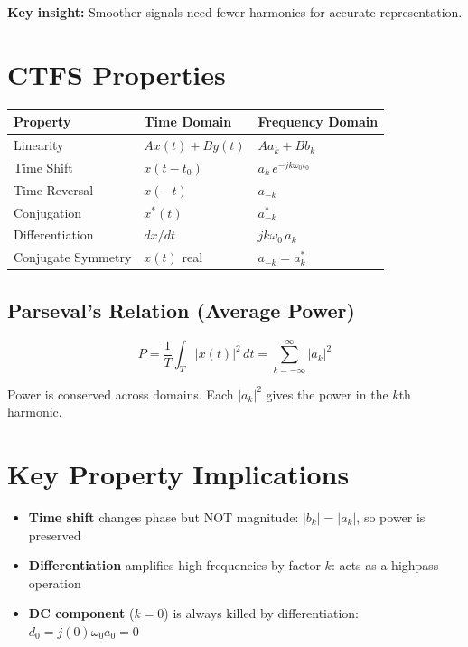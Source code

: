\documentclass[11pt]{article}
\begin{document}
\textbf{Key insight:} Smoother signals need fewer harmonics for accurate representation.

\section*{CTFS Properties}

\begin{center}
\begin{tabular}{|l|l|l|}
\hline
\textbf{Property} & \textbf{Time Domain} & \textbf{Frequency Domain} \\
\hline
Linearity & $Ax(t) + By(t)$ & $Aa_k + Bb_k$ \\
\hline
Time Shift & $x(t - t_0)$ & $a_k \, e^{-jk\omega_0 t_0}$ \\
\hline
Time Reversal & $x(-t)$ & $a_{-k}$ \\
\hline
Conjugation & $x^*(t)$ & $a_{-k}^*$ \\
\hline
Differentiation & $dx/dt$ & $jk\omega_0 \, a_k$ \\
\hline
Conjugate Symmetry & $x(t)$ real & $a_{-k} = a_k^*$ \\
\hline
\end{tabular}
\end{center}

\subsection*{Parseval's Relation (Average Power)}

\[P = \frac{1}{T} \int_T |x(t)|^2 \, dt = \sum_{k=-\infty}^{\infty} |a_k|^2\]

Power is conserved across domains. Each $|a_k|^2$ gives the power in the $k$th harmonic.

\section*{Key Property Implications}

\begin{itemize}
  \item \textbf{Time shift} changes phase but NOT magnitude: $|b_k| = |a_k|$, so power is preserved
  \item \textbf{Differentiation} amplifies high frequencies by factor $k$: acts as a highpass operation
  \item \textbf{DC component} ($k=0$) is always killed by differentiation: $d_0 = j(0)\omega_0 a_0 = 0$
\end{itemize}
\end{document}
